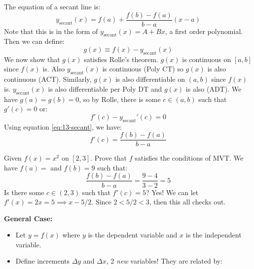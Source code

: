 \begin{itemize}
    \begin{prooof}
        The equation of a secant line is:
        \begin{equation}
            y_\text{secant}(x)=f(a)+\frac{f(b)-f(a)}{b-a}\left(x-a\right)
            \label{eq:13-secant}
        \end{equation}
        Note that this is in the form of $y_\text{secant}(x)=A+Bx$, a first order polynomial. Then we can define:
        \begin{equation}
            g(x)\equiv f(x)-y_\text{secant}(x)
            \label{eq:}
        \end{equation}
        We now show that $g(x)$ satisfies Rolle's theorem. $g(x)$ is continuous on $[a,b]$ since $f(x)$ is. Also $y_\text{secant}(x)$ is continuous (Poly CT) so $g(x)$ is also continuous (ACT). Similarly, $g(x)$ is also differentiable on $(a,b)$ since $f(x)$ is. $y_\text{secant}(x)$ is also differentiable per Poly DT and $g(x)$ is also (ADT). We have $g(a)=g(b)=0$, so by Rolle, there is some $c\in (a,b)$ such that $g'(c)=0$ or:
        \begin{equation}
            f'(c)-y_\text{secant}'(c)=0
            \label{eq:}
        \end{equation}
        Using equation \ref{eq:13-secant}, we have:
        \begin{equation}
            f'(c)=\frac{f(b)-f(a)}{b-a}
            \label{eq:}
        \end{equation}
    \end{prooof}
    \begin{example}
        Given $f(x)=x^2$ on $[2,3]$. Prove that $f$ satisfies the conditions of MVT. We have $f(a)=$ and $f(b)=9$ such that:
        \begin{equation}
            \frac{f(b)-f(a)}{b-a}=\frac{9-4}{3-2}=5
            \label{eq:}
        \end{equation}
        Is there some $c\in (2,3)$ such that $f'(c)=5$? Yes! We can let $f'(x)=2x=5 \implies x-5/2$. Since $2<5/2<3$, then this all checks out.
    \end{example}
\begin{multicols}{2}
    \textbf{General Case:}
    \begin{itemize}
        \item Let $y=f(x)$ where $y$ is the dependent variable and $x$ is the independent variable.
        \item Define increments $\Delta y$ and $\Delta x$, 2 \textit{new} variables! They are related by:
        \begin{equation}

\end{equation}
\end{itemize}
\end{multicols}
\end{itemize}
